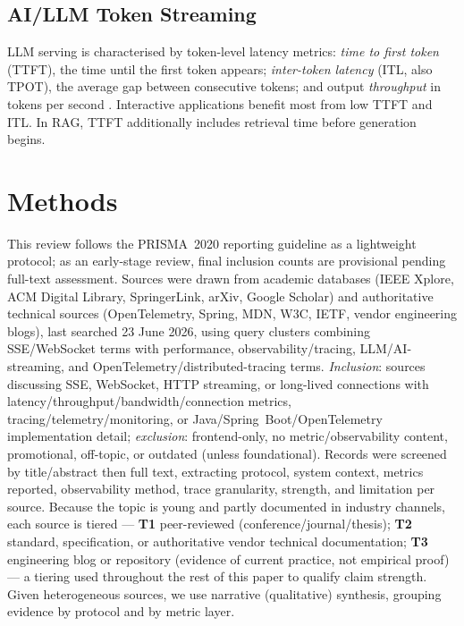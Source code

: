 \documentclass[11pt]{article}
\begin{document}
\subsection{AI/LLM Token Streaming}
LLM serving is characterised by token-level latency metrics: \emph{time to first token} (TTFT), the time until the first token appears; \emph{inter-token latency} (ITL, also TPOT), the average gap between consecutive tokens; and output \emph{throughput} in tokens per second \cite{arxivserving2025,chiron2025}. Interactive applications benefit most from low TTFT and ITL. In RAG, TTFT additionally includes retrieval time before generation begins.

\section{Methods}
This review follows the PRISMA~2020 reporting guideline \cite{prisma2020} as a lightweight protocol; as an early-stage review, final inclusion counts are provisional pending full-text assessment. Sources were drawn from academic databases (IEEE Xplore, ACM Digital Library, SpringerLink, arXiv, Google Scholar) and authoritative technical sources (OpenTelemetry, Spring, MDN, W3C, IETF, vendor engineering blogs), last searched 23 June 2026, using query clusters combining SSE/WebSocket terms with performance, observability/tracing, LLM/AI-streaming, and OpenTelemetry/distributed-tracing terms. \emph{Inclusion}: sources discussing SSE, WebSocket, HTTP streaming, or long-lived connections with latency/throughput/bandwidth/connection metrics, tracing/telemetry/monitoring, or Java\slash Spring~Boot\slash OpenTelemetry implementation detail; \emph{exclusion}: frontend-only, no metric/observability content, promotional, off-topic, or outdated (unless foundational). Records were screened by title/abstract then full text, extracting protocol, system context, metrics reported, observability method, trace granularity, strength, and limitation per source. Because the topic is young and partly documented in industry channels, each source is tiered --- \textbf{T1} peer-reviewed (conference/journal/thesis); \textbf{T2} standard, specification, or authoritative vendor technical documentation; \textbf{T3} engineering blog or repository (evidence of current practice, not empirical proof) --- a tiering used throughout the rest of this paper to qualify claim strength. Given heterogeneous sources, we use narrative (qualitative) synthesis, grouping evidence by protocol and by metric layer.
\end{document}
